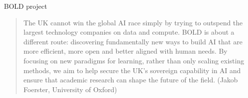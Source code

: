\documentclass[10pt]{beamer}
\begin{document}
\begin{titledslide}{BOLD project}

  \begin{quote}
    The UK cannot win the global AI race simply by trying to outspend
    the largest technology companies on data and compute.  BOLD is
    about a different route: discovering fundamentally new ways to
    build AI that are more efficient, more open and better aligned
    with human needs.  By focusing on new paradigms for learning,
    rather than only scaling existing methods, we aim to help secure
    the UK's sovereign capability in AI and ensure that academic
    research can shape the future of the field. (Jakob Foerster,
    University of Oxford)
  \end{quote}
  
\end{titledslide}
\end{document}
